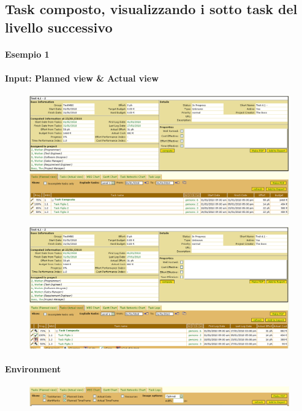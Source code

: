 \subsection{Task composto, visualizzando i sotto task del livello successivo}
\paragraph{Esempio 1}
\paragraph{Input: Planned view & Actual view}
\begin{figure}[h!]
\centering
\includegraphics[width=\textwidth]{tests/TEST_WBS/4.1/4.1_2/Esempio_1/input.png}
\end{figure}
\begin{figure}[h!]
\centering
\includegraphics[width=\textwidth]{tests/TEST_WBS/4.1/4.1_2/Esempio_1/input_actual.png}
\end{figure}
\newpage

\paragraph{Environment}
\begin{figure}[h!]
\centering
\includegraphics[width=\textwidth]{tests/TEST_WBS/4.1/4.1_2/Esempio_1/environment.png}
\end{figure}


